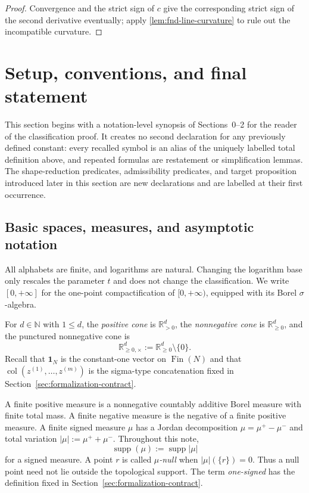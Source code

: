 \documentclass[9pt]{extarticle}
\theoremstyle{definition}
\theoremstyle{remark}
\newcommand{\R}{\mathbb R}
\newcommand{\N}{\mathbb N}
\newcommand{\supp}{\operatorname{supp}}
\newcommand{\one}{\mathbf 1}
\newcommand{\col}{\operatorname{col}}
\newcommand{\abs}[1]{\left\lvert #1\right\rvert}
\begin{document}
\begin{proof}
Convergence and the strict sign of $c$ give the corresponding strict sign of
the second derivative eventually; apply
\cref{lem:fnd-line-curvature} to rule out the incompatible curvature.
\end{proof}

\setcounter{section}{2}
\section{Setup, conventions, and final statement}
\label{sec:setup}

This section begins with a notation-level synopsis of Sections~0--2 for the
reader of the classification proof.  It creates no second declaration for
any previously defined constant: every recalled symbol is an alias of the
uniquely labelled total definition above, and repeated formulas are
restatement or simplification lemmas.  The shape-reduction predicates,
admissibility predicates, and target proposition introduced later in this
section are new declarations and are labelled at their first occurrence.

\subsection{Basic spaces, measures, and asymptotic notation}

All alphabets are finite, and logarithms are natural. Changing the logarithm
base only rescales the parameter $t$ and does not change the classification.
We write $[0,+\infty]$ for the one-point compactification of $[0,+\infty)$,
equipped with its Borel $\sigma$-algebra.

For $d\in\N$ with $1\leq d$, the \emph{positive cone} is $\R^d_{>0}$, the
\emph{nonnegative cone} is $\R^d_{\geq0}$, and the punctured nonnegative cone
is
\[
 \R^d_{\geq0,\times}:=\R^d_{\geq0}\setminus\{0\}.
\]
Recall that $\one_N$ is the constant-one vector on $\operatorname{Fin}(N)$
and that $\col(z^{(1)},\ldots,z^{(m)})$ is the sigma-type concatenation fixed
in Section~\ref{sec:formalization-contract}.

A finite positive measure is a nonnegative countably additive Borel measure
with finite total mass. A finite negative measure is the negative of a finite
positive measure. A finite signed measure $\mu$ has a Jordan decomposition
$\mu=\mu^+-\mu^-$ and total variation
$\abs{\mu}:=\mu^++\mu^-$. Throughout this note,
\[
 \supp(\mu):=\supp\abs{\mu}
\]
for a signed measure. A point $r$ is called \emph{$\mu$-null} when
$\abs{\mu}(\{r\})=0$. Thus a null point need not lie outside the topological
support.  The term \emph{one-signed} has the definition fixed in
Section~\ref{sec:formalization-contract}.
\end{document}
